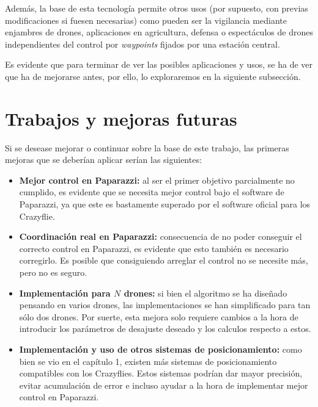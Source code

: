 Además, la base de esta tecnología permite otros usos (por supuesto, con previas modificaciones si fuesen necesarias) 
como pueden ser la vigilancia mediante enjambres de drones, aplicaciones en agricultura, defensa o 
espectáculos de drones independientes del control por \textit{waypoints} fijados por una estación central. 

Es evidente que para terminar de ver las posibles aplicaciones y usos, 
se ha de ver que ha de mejorarse antes, por ello, lo exploraremos en la siguiente subsección.


\section{Trabajos y mejoras futuras}

Si se desease mejorar o continuar sobre la base de este trabajo, las primeras mejoras que se deberían aplicar serían las siguientes:

\begin{itemize}
    \item \textbf{Mejor control en Paparazzi:} al ser el primer objetivo parcialmente no cumplido, es evidente que se necesita mejor control bajo el software de Paparazzi, 
    ya que este es bastamente superado por el software oficial para los Crazyflie.

    \item \textbf{Coordinación real en Paparazzi:} consecuencia de no poder conseguir el correcto control en Paparazzi, es evidente que esto también es necesario corregirlo. 
    Es posible que consiguiendo arreglar el control no se necesite más, pero no es seguro.

    \item \textbf{Implementación para $N$ drones:} si bien el algoritmo se ha diseñado pensando en varios drones, las implementaciones se han simplificado para tan sólo dos drones. 
    Por suerte, esta mejora solo requiere cambios a la hora de introducir los parámetros de desajuste deseado y los calculos respecto a estos.

    \item \textbf{Implementación y uso de otros sistemas de posicionamiento:} 
    como bien se vio en el capítulo 1, existen más sistemas de posicionamiento compatibles con los Crazyflies.
    Estos sistemas podrían dar mayor precisión, evitar acumulación de error e incluso ayudar a la hora de implementar mejor control en Paparazzi. 
\end{itemize}

